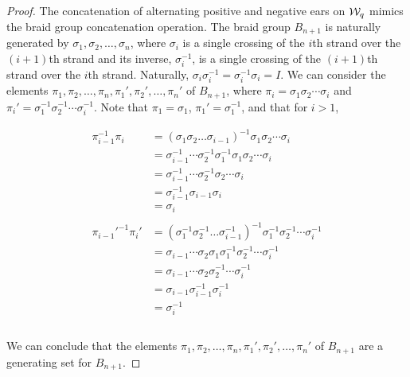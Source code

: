 \documentclass[paper.tex]{subfiles}
\begin{document}
\begin{proof}

    The concatenation of alternating positive and negative ears on $\mathcal{W}_q$ mimics the braid group concatenation operation. The braid group $B_{n+1}$ is naturally generated by $\sigma_1, \sigma_2, \dots, \sigma_{n}$, where $\sigma_i$ is a single crossing of the $i$th strand over the $(i + 1)$th strand and its inverse, $\sigma_i^{-1}$, is a single crossing of the $(i + 1)$th strand over the $i$th strand. Naturally, $\sigma_i \sigma_i^{-1} = \sigma_i^{-1} \sigma_i = I$. We can consider the elements $\pi_1, \pi_2, \dots, \pi_n, \pi_1', \pi_2', \dots, \pi_n'$ of $B_{n+1}$, where $\pi_i = \sigma_1 \sigma_2 \cdots \sigma_i$ and $\pi_i' = \sigma_1^{-1} \sigma_2^{-1} \cdots \sigma_i^{-1}$. Note that $\pi_1 = \sigma_1$, $\pi_1' = \sigma_1^{-1}$, and that for $i > 1$,

    \begin{align*}
        \pi_{i-1}^{-1} \pi_i  &= (\sigma_1 \sigma_2 \dots \sigma_{i - 1})^{-1} \sigma_1 \sigma_2 \cdots \sigma_i \\
                              &= \sigma_{i - 1}^{-1} \cdots \sigma_2^{-1} \sigma_1^{-1} \sigma_1 \sigma_2 \cdots \sigma_i \\
                              &= \sigma_{i - 1}^{-1} \cdots \sigma_2^{-1} \sigma_2 \cdots \sigma_i \\
                              &= \sigma_{i - 1}^{-1} \sigma_{i - 1} \sigma_i  \\
                              &= \sigma_i \\ \\
        \pi_{i-1}'^{-1} \pi_i'  &= (\sigma_1^{-1} \sigma_2^{-1} \dots \sigma_{i - 1}^{-1})^{-1} \sigma_1^{-1} \sigma_2^{-1} \cdots \sigma_i^{-1} \\
                                &= \sigma_{i - 1} \cdots \sigma_2 \sigma_1 \sigma_1^{-1} \sigma_2^{-1} \cdots \sigma_i^{-1} \\
                                &= \sigma_{i - 1} \cdots \sigma_2 \sigma_2^{-1} \cdots \sigma_i^{-1} \\
                                &= \sigma_{i - 1} \sigma_{i - 1}^{-1} \sigma_i^{-1}  \\
                                &= \sigma_i^{-1} \\ \\
    \end{align*}

    We can conclude that the elements $\pi_1, \pi_2, \dots, \pi_n, \pi_1', \pi_2', \dots, \pi_n'$ of $B_{n+1}$ are a generating set for $B_{n+1}$.


\end{proof}
\end{document}
